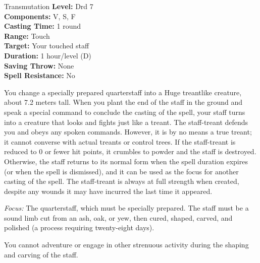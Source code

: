 {Transmutation}
{
	\textbf{Level:}
	Drd 7\\
	\textbf{Components:}
	V, S, F\\
	\textbf{Casting Time:}
	1 round\\
	\textbf{Range:}
	Touch\\
	\textbf{Target:}
	Your touched staff\\
	\textbf{Duration:}
	1 hour/level (D)\\
	\textbf{Saving Throw:}
	None\\
	\textbf{Spell Resistance:}
	No\\
}
{
	You change a specially prepared quarterstaff into a Huge treantlike creature, about 7.2 meters tall. When you plant the end of the staff in the ground and speak a special command to conclude the casting of the spell, your staff turns into a creature that looks and fights just like a treant. The staff-treant defends you and obeys any spoken commands. However, it is by no means a true treant; it cannot converse with actual treants or control trees. If the staff-treant is reduced to 0 or fewer hit points, it crumbles to powder and the staff is destroyed. Otherwise, the staff returns to its normal form when the spell duration expires (or when the spell is dismissed), and it can be used as the focus for another casting of the spell. The staff-treant is always at full strength when created, despite any wounds it may have incurred the last time it appeared.

	\textit{Focus:}
	The quarterstaff, which must be specially prepared. The staff must be a sound limb cut from an ash, oak, or yew, then cured, shaped, carved, and polished (a process requiring twenty-eight days).

	You cannot adventure or engage in other strenuous activity during the shaping and carving of the staff.

}
